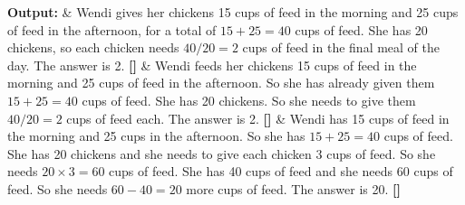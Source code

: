 \documentclass[lettersize,journal]{IEEEtran}
\begin{document}
\begin{table}[t]
\begin{tabular}
				\textbf{Output:}
				&
				Wendi gives her chickens 15 cups of feed in the morning and 25 cups of
				feed in the afternoon, for a total of $15 + 25 = 40$ cups of feed.
				She has 20 chickens, so each chicken needs $40 / 20 = 2$ cups of feed
				in the final meal of the day. The answer is 2.
				\textbf{[]}
				&
				Wendi feeds her chickens 15 cups of feed in the morning and 25 cups of
				feed in the afternoon. So she has already given them
				$15 + 25 = 40$ cups of feed. She has 20 chickens. So she needs to give
				them $40 / 20 = 2$ cups of feed each. The answer is 2.
				\textbf{[]}
				&
				Wendi has 15 cups of feed in the morning and 25 cups in the afternoon.
				So she has $15 + 25 = 40$ cups of feed. She has 20 chickens and she
				needs to give each chicken 3 cups of feed. So she needs
				$20 \times 3 = 60$ cups of feed. She has 40 cups of feed and she needs
				60 cups of feed. So she needs $60 - 40 = 20$ more cups of feed.
				The answer is 20. \textbf{[]} \\
				
				\bottomrule
			\end{tabular}
			\caption{Performance of different methods on the GSM8K dataset and
				example answers generated by each method.}
			\label{tab:gsm8k_qualitative_example}
		\end{table}
\end{document}
